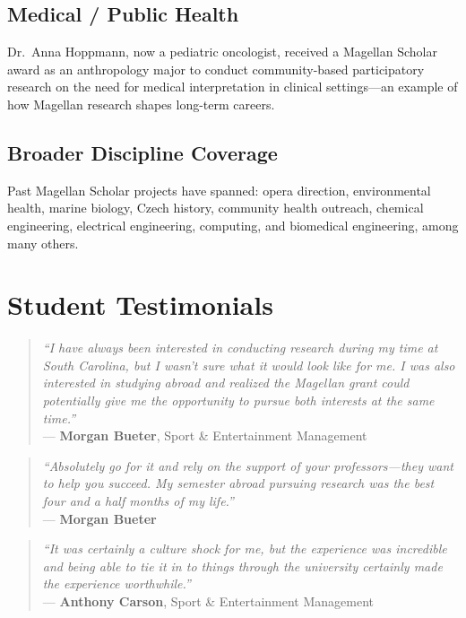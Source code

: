 \documentclass[11pt, letterpaper]{article}
\begin{document}
\subsection{Medical / Public Health}

Dr.\ Anna Hoppmann, now a pediatric oncologist, received a Magellan Scholar award as an anthropology major to conduct community-based participatory research on the need for medical interpretation in clinical settings---an example of how Magellan research shapes long-term careers.

\subsection{Broader Discipline Coverage}

Past Magellan Scholar projects have spanned: opera direction, environmental health, marine biology, Czech history, community health outreach, chemical engineering, electrical engineering, computing, and biomedical engineering, among many others.

\section{Student Testimonials}

\begin{quote}
\textit{``I have always been interested in conducting research during my time at South Carolina, but I wasn't sure what it would look like for me. I was also interested in studying abroad and realized the Magellan grant could potentially give me the opportunity to pursue both interests at the same time.''}\\
\hfill --- \textbf{Morgan Bueter}, Sport \& Entertainment Management
\end{quote}

\begin{quote}
\textit{``Absolutely go for it and rely on the support of your professors---they want to help you succeed. My semester abroad pursuing research was the best four and a half months of my life.''}\\
\hfill --- \textbf{Morgan Bueter}
\end{quote}

\begin{quote}
\textit{``It was certainly a culture shock for me, but the experience was incredible and being able to tie it in to things through the university certainly made the experience worthwhile.''}\\
\hfill --- \textbf{Anthony Carson}, Sport \& Entertainment Management
\end{quote}
\end{document}

